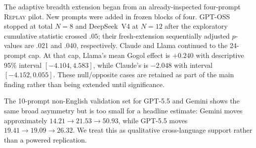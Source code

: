 \documentclass[10pt]{article}
\newcommand{\replay}{\textsc{Replay}}
\begin{document}
\begin{table}[H]
\centering
\small
\setlength{\tabcolsep}{3.8pt}
\caption{Six-model decomposition. For GPT-5.5 and Gemini, $N=40$ is fixed. For the four breadth models, $N$ is the adaptive cumulative sample at stopping or cap. Cumulative $p_G$ is a descriptive one-sided $t$ test for $P-R>0$; for positive breadth stops, $p_{\mathrm{seq}}$ is the Bonferroni-adjusted one-sided test on fresh extension prompts only.}
\label{tab:replay-six-full}
\end{table}

The adaptive breadth extension began from an already-inspected four-prompt \replay{} pilot. New prompts were added in frozen blocks of four. GPT-OSS stopped at total $N=8$ and DeepSeek~V4 at $N=12$ after the exploratory cumulative statistic crossed $.05$; their fresh-extension sequentially adjusted $p$-values are .021 and .040, respectively. Claude and Llama continued to the 24-prompt cap. At that cap, Llama's mean Gogol effect is $+0.240$ with descriptive 95\% interval $[-4.104,4.583]$, while Claude's is $-2.048$ with interval $[-4.152,0.055]$. These null/opposite cases are retained as part of the main finding rather than being extended until significance.

The 10-prompt non-English validation set for GPT-5.5 and Gemini shows the same broad asymmetry but is too small for a headline estimate: Gemini moves approximately $14.21\rightarrow21.53\rightarrow50.93$, while GPT-5.5 moves $19.41\rightarrow19.09\rightarrow26.32$. We treat this as qualitative cross-language support rather than a powered replication.
\end{document}
